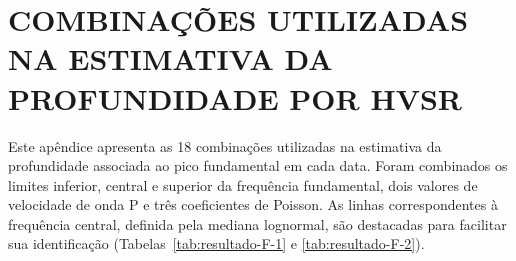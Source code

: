 \chapter{COMBINAÇÕES UTILIZADAS NA ESTIMATIVA DA PROFUNDIDADE POR HVSR}\label{ap:hvsr}
\setcounter{figure}{0}
\setcounter{table}{0}
\setcounter{quadro}{0}

Este apêndice apresenta as 18 combinações utilizadas na estimativa da profundidade associada ao pico fundamental em cada data. Foram combinados os limites inferior, central e superior da frequência fundamental, dois valores de velocidade de onda P e três coeficientes de Poisson. As linhas correspondentes à frequência central, definida pela mediana lognormal, são destacadas para facilitar sua identificação (Tabelas~\ref{tab:resultado-F-1} e \ref{tab:resultado-F-2}).

